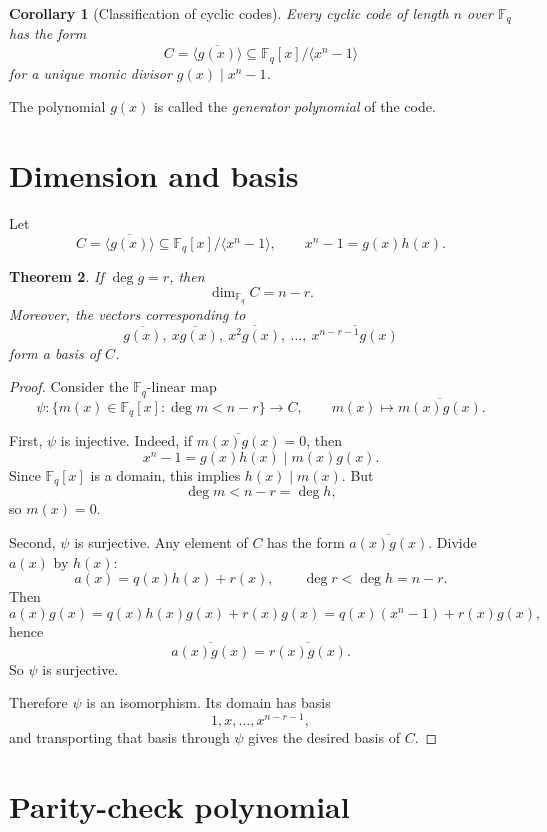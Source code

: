 \documentclass[11pt]{article}
\newtheorem{theorem}{Theorem}[section]
\newtheorem{corollary}[theorem]{Corollary}
\theoremstyle{definition}
\newcommand{\F}{\mathbb{F}}
\newcommand{\ideal}[1]{\langle #1\rangle}
\newcommand{\ol}[1]{\overline{#1}}
\begin{document}
	\begin{corollary}[Classification of cyclic codes]
		Every cyclic code of length \(n\) over \(\F_q\) has the form
		\[
		C=\ideal{\ol{g(x)}}\subseteq \F_q[x]/\ideal{x^n-1}
		\]
		for a unique monic divisor \(g(x)\mid x^n-1\).
	\end{corollary}
	
	The polynomial \(g(x)\) is called the \emph{generator polynomial} of the code.
	
	\section{Dimension and basis}
	
	Let
	\[
	C=\ideal{\ol{g(x)}}\subseteq \F_q[x]/\ideal{x^n-1},
	\qquad
	x^n-1=g(x)h(x).
	\]
	
	\begin{theorem}\label{thm:dimension}
		If \(\deg g=r\), then
		\[
		\dim_{\F_q} C = n-r.
		\]
		Moreover, the vectors corresponding to
		\[
		\ol{g(x)},\ \ol{xg(x)},\ \ol{x^2g(x)},\ \dots,\ \ol{x^{n-r-1}g(x)}
		\]
		form a basis of \(C\).
	\end{theorem}
	
	\begin{proof}
		Consider the \(\F_q\)-linear map
		\[
		\psi:\{m(x)\in \F_q[x]: \deg m<n-r\}\to C,
		\qquad
		m(x)\mapsto \ol{m(x)g(x)}.
		\]
		
		First, \(\psi\) is injective. Indeed, if \(\ol{m(x)g(x)}=0\), then
		\[
		x^n-1=g(x)h(x)\mid m(x)g(x).
		\]
		Since \(\F_q[x]\) is a domain, this implies \(h(x)\mid m(x)\). But
		\[
		\deg m < n-r = \deg h,
		\]
		so \(m(x)=0\).
		
		Second, \(\psi\) is surjective. Any element of \(C\) has the form \(\ol{a(x)g(x)}\). Divide \(a(x)\) by \(h(x)\):
		\[
		a(x)=q(x)h(x)+r(x),
		\qquad
		\deg r<\deg h=n-r.
		\]
		Then
		\[
		a(x)g(x)=q(x)h(x)g(x)+r(x)g(x)=q(x)(x^n-1)+r(x)g(x),
		\]
		hence
		\[
		\ol{a(x)g(x)}=\ol{r(x)g(x)}.
		\]
		So \(\psi\) is surjective.
		
		Therefore \(\psi\) is an isomorphism. Its domain has basis
		\[
		1,x,\dots,x^{n-r-1},
		\]
		and transporting that basis through \(\psi\) gives the desired basis of \(C\).
	\end{proof}
	
	\section{Parity-check polynomial}
	
\end{document}

